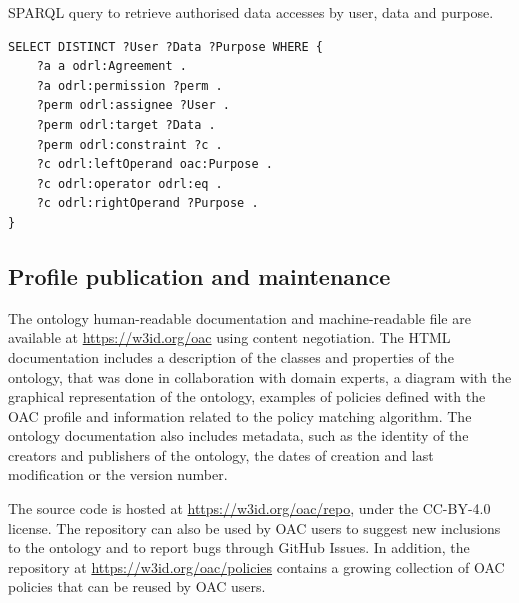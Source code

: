 \begin{listing}[ht]
\caption{SPARQL query to retrieve authorised data accesses by user, data and purpose.}
\label{list:sparql_agreement}
\begin{verbatim}
SELECT DISTINCT ?User ?Data ?Purpose WHERE {
    ?a a odrl:Agreement .
    ?a odrl:permission ?perm .
    ?perm odrl:assignee ?User .
    ?perm odrl:target ?Data .
    ?perm odrl:constraint ?c .
    ?c odrl:leftOperand oac:Purpose .
    ?c odrl:operator odrl:eq .
    ?c odrl:rightOperand ?Purpose .
}
\end{verbatim}
\end{listing}

\subsection{Profile publication and maintenance}
\label{sec:oac_publication}

The ontology human-readable documentation and machine-readable file are available at \url{https://w3id.org/oac} using content negotiation.
The HTML documentation includes a description of the classes and properties of the ontology, that was done in collaboration with domain experts, a diagram with the graphical representation of the ontology, examples of policies defined with the OAC profile and information related to the policy matching algorithm.
The ontology documentation also includes metadata, such as the identity of the creators and publishers of the ontology, the dates of creation and last modification or the version number.

The source code is hosted at \url{https://w3id.org/oac/repo}, under the CC-BY-4.0 license.
The repository can also be used by OAC users to suggest new inclusions to the ontology and to report bugs through GitHub Issues.
In addition, the repository at \url{https://w3id.org/oac/policies} contains a growing collection of OAC policies that can be reused by OAC users.